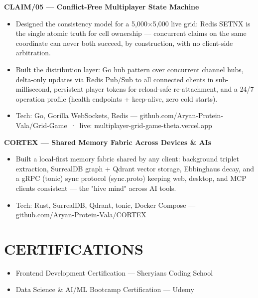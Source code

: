 \documentclass[9pt]{article}
\begin{document}
\textbf{CLAIM/05  ---  Conflict-Free Multiplayer State Machine}
\vspace{1pt}
\begin{itemize}[leftmargin=11pt,itemsep=0pt,topsep=1pt,parsep=0pt]
\item Designed the consistency model for a 5,000×5,000 live grid: Redis SETNX is the single atomic truth for cell ownership  ---  concurrent claims on the same coordinate can never both succeed, by construction, with no client-side arbitration.
\item Built the distribution layer: Go hub pattern over concurrent channel hubs, delta-only updates via Redis Pub/Sub to all connected clients in sub-millisecond, persistent player tokens for reload-safe re-attachment, and a 24/7 operation profile (health endpoints + keep-alive, zero cold starts).
\item Tech: Go, Gorilla WebSockets, Redis  ---  github.com/Aryan-Protein-Vala/Grid-Game \,·\, live: multiplayer-grid-game-theta.vercel.app
\end{itemize}
\textbf{CORTEX  ---  Shared Memory Fabric Across Devices \& AIs}
\vspace{1pt}
\begin{itemize}[leftmargin=11pt,itemsep=0pt,topsep=1pt,parsep=0pt]
\item Built a local-first memory fabric shared by any client: background triplet extraction, SurrealDB graph + Qdrant vector storage, Ebbinghaus decay, and a gRPC (tonic) sync protocol (sync.proto) keeping web, desktop, and MCP clients consistent  ---  the "hive mind" across AI tools.
\item Tech: Rust, SurrealDB, Qdrant, tonic, Docker Compose  ---  github.com/Aryan-Protein-Vala/CORTEX
\end{itemize}
\section*{CERTIFICATIONS}
\begin{itemize}[leftmargin=11pt,itemsep=0pt,topsep=1pt,parsep=0pt]
\item Frontend Development Certification  ---  Sheryians Coding School
\item Data Science \& AI/ML Bootcamp Certification  ---  Udemy
\end{itemize}
\end{document}
